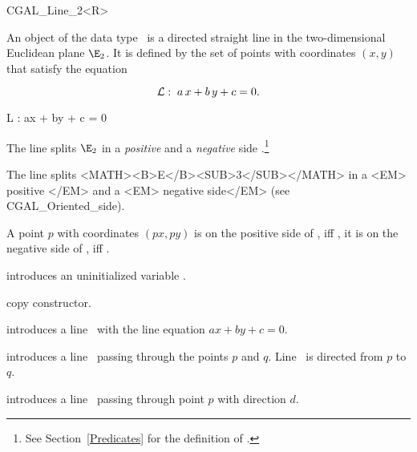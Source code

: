
\begin {classtemplate} {CGAL_Line_2<R>}

An object  of the data type \classname\ is a directed
straight line in the two-dimensional Euclidean plane $\E_2$. It is
defined by the set of points with coordinates $(x,y)$ that satisfy the
equation 
\begin{TexOnly}
\[ {\cal L}:\; a\, x +b\, y +c = 0. \]
\end{TexOnly}
\begin{HtmlOnly}
 L : ax + by + c = 0 
\end{HtmlOnly}
 
\begin{TexOnly}%
The line splits $\E_2$ in a {\em positive} and a {\em negative}
side%
.\footnote{See Section~\ref{Predicates} for the definition of 
.}
\end{TexOnly}
\begin{HtmlOnly}
The line splits <MATH><B>E</B><SUB>3</SUB></MATH> in a <EM> positive
</EM> and a <EM> negative side</EM>
(see CGAL_Oriented_side).
\end{HtmlOnly}
A point $p$ with coordinates $(px, py)$
is on the positive side of , iff
, it is
on the negative side of , iff 
.

\creation
{}


\hidden {}
             {introduces an uninitialized variable \var.}

\hidden {}
 	    {copy constructor.}

            {introduces a line \var\ with the line equation $ax +by +c = 0$.}

            {introduces a line \var\ passing through the points $p$ and $q$. 
             Line \var\ is directed from $p$ to $q$.}

            {introduces a line \var\ passing through point $p$ with 
             direction $d$.}


\end{classtemplate}
